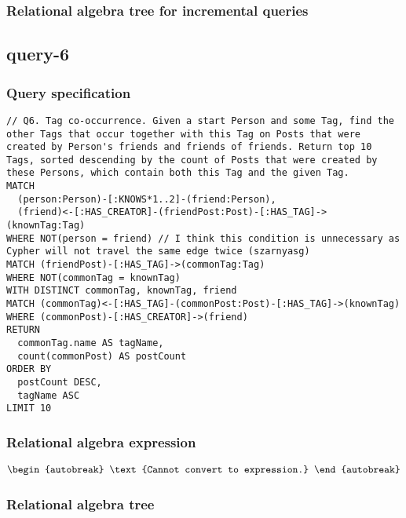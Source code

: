 
\subsubsection*{Relational algebra tree for incremental queries}

\subsection{query-6}

\subsubsection*{Query specification}

\begin{lstlisting}
// Q6. Tag co-occurrence. Given a start Person and some Tag, find the other Tags that occur together with this Tag on Posts that were created by Person's friends and friends of friends. Return top 10 Tags, sorted descending by the count of Posts that were created by these Persons, which contain both this Tag and the given Tag.
MATCH
  (person:Person)-[:KNOWS*1..2]-(friend:Person),
  (friend)<-[:HAS_CREATOR]-(friendPost:Post)-[:HAS_TAG]->(knownTag:Tag)
WHERE NOT(person = friend) // I think this condition is unnecessary as Cypher will not travel the same edge twice (szarnyasg)
MATCH (friendPost)-[:HAS_TAG]->(commonTag:Tag)
WHERE NOT(commonTag = knownTag)
WITH DISTINCT commonTag, knownTag, friend
MATCH (commonTag)<-[:HAS_TAG]-(commonPost:Post)-[:HAS_TAG]->(knownTag)
WHERE (commonPost)-[:HAS_CREATOR]->(friend)
RETURN
  commonTag.name AS tagName,
  count(commonPost) AS postCount
ORDER BY
  postCount DESC,
  tagName ASC
LIMIT 10
\end{lstlisting}

\subsubsection*{Relational algebra expression}

\begin{align*}
\begin{autobreak}
\text{Cannot convert to expression.}
\end{autobreak}
\end{align*}

\subsubsection*{Relational algebra tree}

